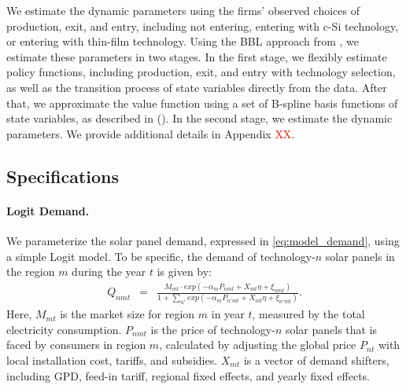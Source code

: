 \documentclass[12pt, letter]{article}
\begin{document}


We estimate the dynamic parameters using the firms' observed choices of production, exit, and entry, including not entering, entering with c-Si technology, or entering with thin-film technology. Using the BBL approach from \citet{bajari2007estimating}, we estimate these parameters in two stages. In the first stage, we flexibly estimate policy functions, including production, exit, and entry with technology selection, as well as the transition process of state variables directly from the data. After that, we approximate the value function using a set of B-spline basis functions of state variables, as described in (\citet{sweeting2013dynamic}). In the second stage, we estimate the dynamic parameters. We provide additional details in Appendix \textcolor{red}{XX}.

\subsection{Specifications}
\label{subsec:est_specifications}

\paragraph{Logit Demand.}
We parameterize the solar panel demand, expressed in \eqref{eq:model_demand}, using a simple Logit model. To be specific, the demand of technology-$n$ solar panels in the region $m$ during the year $t$ is given by:
\begin{eqnarray*}
Q_{nmt} & = & \frac{M_{mt}\cdot exp(-\alpha_{m} P_{nmt} + X_{mt}\eta +\xi_{nmt})}{1+\sum_{n'}exp(-\alpha_{m} P_{n'mt} + X_{mt}\eta +\xi_{n'mt})}.  \label{eq:demand_specification}
\end{eqnarray*}
Here, $M_{mt}$ is the market size for region $m$ in year $t$, measured by the total electricity consumption. $P_{nmt}$ is the price of technology-$n$ solar panels that is faced by consumers in region $m$, calculated by adjusting the global price $P_{nt}$ with local installation cost, tariffs, and subsidies. $X_{mt}$ is a vector of demand shifters, including GPD, feed-in tariff, regional fixed effects, and yearly fixed effects. 
\end{document}
